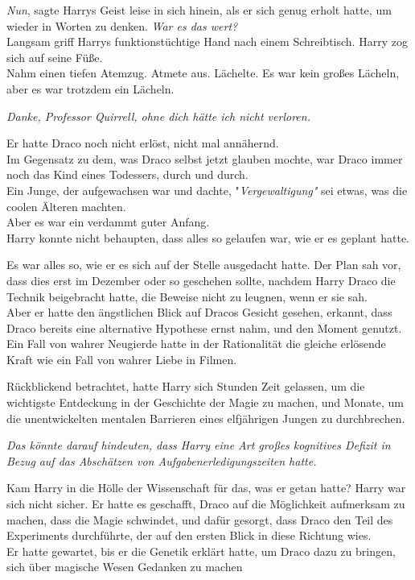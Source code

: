 {\emph{Nun}, sagte Harrys Geist leise in sich hinein, als er sich genug erholt hatte, um wieder in Worten zu denken. \emph{War es das wert?}\\ Langsam griff Harrys funktionstüchtige Hand nach einem Schreibtisch. Harry zog sich auf seine Füße.\\ Nahm einen tiefen Atemzug. Atmete aus. Lächelte. Es war kein großes Lächeln, aber es war trotzdem ein Lächeln.

\emph{Danke, Professor Quirrell, ohne dich hätte ich nicht verloren.}

Er hatte Draco noch nicht erlöst, nicht mal annähernd.\\ Im Gegensatz zu dem, was Draco selbst jetzt glauben mochte, war Draco immer noch das Kind eines Todessers, durch und durch.\\ Ein Junge, der aufgewachsen war und dachte, "\emph{Vergewaltigung"} sei etwas, was die coolen Älteren machten.\\ Aber es war ein verdammt guter Anfang.\\ Harry konnte nicht behaupten, dass alles so gelaufen war, wie er es geplant hatte.

Es war alles so, wie er es sich auf der Stelle ausgedacht hatte. Der Plan sah vor, dass dies erst im Dezember oder so geschehen sollte, nachdem Harry Draco die Technik beigebracht hatte, die Beweise nicht zu leugnen, wenn er sie sah.\\ Aber er hatte den ängstlichen Blick auf Dracos Gesicht gesehen, erkannt, dass Draco bereits eine alternative Hypothese ernst nahm, und den Moment genutzt.\\ Ein Fall von wahrer Neugierde hatte in der Rationalität die gleiche erlösende Kraft wie ein Fall von wahrer Liebe in Filmen.

Rückblickend betrachtet, hatte Harry sich Stunden Zeit gelassen, um die wichtigste Entdeckung in der Geschichte der Magie zu machen, und Monate, um die unentwickelten mentalen Barrieren eines elfjährigen Jungen zu durchbrechen.

\emph{Das könnte darauf hindeuten, dass Harry eine Art großes kognitives Defizit in Bezug} \emph{auf das Abschätzen von Aufgabenerledigungszeiten hatte.}

Kam Harry in die Hölle der Wissenschaft für das, was er getan hatte? Harry war sich nicht sicher. Er hatte es geschafft, Draco auf die Möglichkeit aufmerksam zu machen, dass die Magie schwindet, und dafür gesorgt, dass Draco den Teil des Experiments durchführte, der auf den ersten Blick in diese Richtung wies.\\ Er hatte gewartet, bis er die Genetik erklärt hatte, um Draco dazu zu bringen, sich über magische Wesen Gedanken zu machen

}
